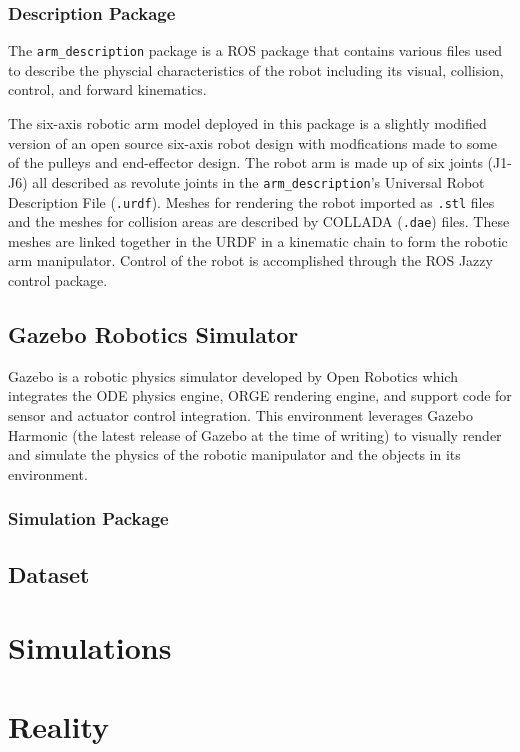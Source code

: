\documentclass[doublespace,draft,nopageskip]{VTthesis} %
\begin{document}
    \subsection{Description Package} \label{ss:description_package}
    The \texttt{arm\_description} package is a ROS package that contains various files used to describe the physcial characteristics of the robot including its visual, collision, control, and forward kinematics.

    The six-axis robotic arm model deployed in this package is a slightly modified version of an open source six-axis robot design with modfications made to some of the pulleys and end-effector design. The robot arm is made up of six joints (J1-J6) all described as revolute joints in the \texttt{arm\_description}'s Universal Robot Description File (\texttt{.urdf}). Meshes for rendering the robot imported as \texttt{.stl} files and the meshes for collision areas are described by COLLADA (\texttt{.dae}) files. These meshes are linked together in the URDF in a kinematic chain to form the robotic arm manipulator.
    Control of the robot is accomplished through the ROS Jazzy control package.
    \section{Gazebo Robotics Simulator} \label{se:gazebo_harmonic_robotics_simulator}
        Gazebo is a robotic physics simulator developed by Open Robotics which integrates the ODE physics engine, ORGE rendering engine, and support code for sensor and actuator control integration. This environment leverages Gazebo Harmonic (the latest release of Gazebo at the time of writing) to visually render and simulate the physics of the robotic manipulator and the objects in its environment. 
    \subsection{Simulation Package} \label{ss:simulation_package}
    \section{Dataset} \label{se:dataset}
     
	\chapter{Simulations} \label{ch:simulations}

	\chapter{Reality} \label{ch:reality}
\end{document}
